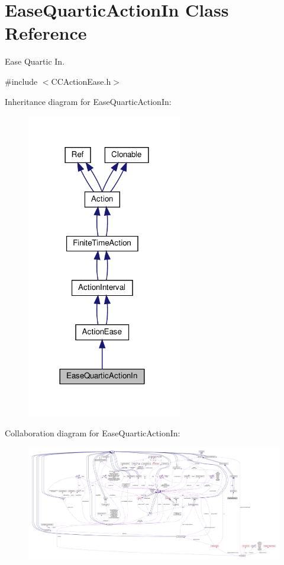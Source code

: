 \hypertarget{classEaseQuarticActionIn}{}\section{Ease\+Quartic\+Action\+In Class Reference}
\label{classEaseQuarticActionIn}


Ease Quartic In.  




{\ttfamily \#include $<$C\+C\+Action\+Ease.\+h$>$}



Inheritance diagram for Ease\+Quartic\+Action\+In\+:
\nopagebreak
\begin{figure}[H]
\begin{center}
\leavevmode
\includegraphics[width=192pt]{classEaseQuarticActionIn__inherit__graph}
\end{center}
\end{figure}


Collaboration diagram for Ease\+Quartic\+Action\+In\+:
\nopagebreak
\begin{figure}[H]
\begin{center}
\leavevmode
\includegraphics[width=350pt]{classEaseQuarticActionIn__coll__graph}
\end{center}
\end{figure}

